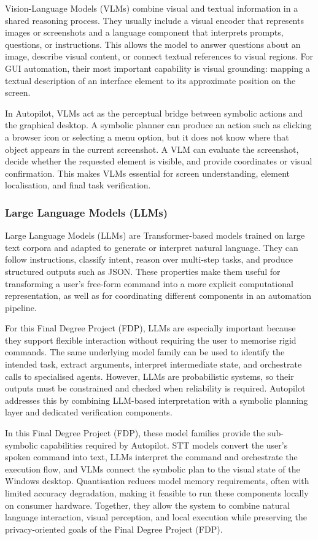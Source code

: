 Vision-Language Models (VLMs) combine visual and textual information in a shared reasoning process. They usually include a visual encoder that represents images or screenshots and a language component that interprets prompts, questions, or instructions. This allows the model to answer questions about an image, describe visual content, or connect textual references to visual regions. For GUI automation, their most important capability is visual grounding: mapping a textual description of an interface element to its approximate position on the screen.

In Autopilot, VLMs act as the perceptual bridge between symbolic actions and the graphical desktop. A symbolic planner can produce an action such as clicking a browser icon or selecting a menu option, but it does not know where that object appears in the current screenshot. A VLM can evaluate the screenshot, decide whether the requested element is visible, and provide coordinates or visual confirmation. This makes VLMs essential for screen understanding, element localisation, and final task verification.

\subsubsection{Large Language Models (LLMs)}

Large Language Models (LLMs) are Transformer-based models trained on large text corpora and adapted to generate or interpret natural language. They can follow instructions, classify intent, reason over multi-step tasks, and produce structured outputs such as JSON. These properties make them useful for transforming a user's free-form command into a more explicit computational representation, as well as for coordinating different components in an automation pipeline.

For this Final Degree Project (FDP), LLMs are especially important because they support flexible interaction without requiring the user to memorise rigid commands. The same underlying model family can be used to identify the intended task, extract arguments, interpret intermediate state, and orchestrate calls to specialised agents. However, LLMs are probabilistic systems, so their outputs must be constrained and checked when reliability is required. Autopilot addresses this by combining LLM-based interpretation with a symbolic planning layer and dedicated verification components.

In this Final Degree Project (FDP), these model families provide the sub-symbolic capabilities required by Autopilot. STT models convert the user's spoken command into text, LLMs interpret the command and orchestrate the execution flow, and VLMs connect the symbolic plan to the visual state of the Windows desktop. Quantisation reduces model memory requirements, often with limited accuracy degradation, making it feasible to run these components locally on consumer hardware. Together, they allow the system to combine natural language interaction, visual perception, and local execution while preserving the privacy-oriented goals of the Final Degree Project (FDP).

